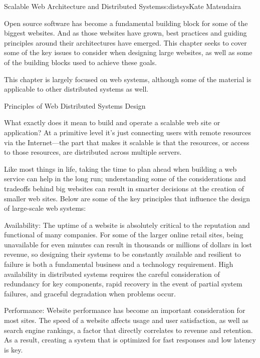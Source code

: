 \begin{aosachapter}{Scalable Web Architecture and Distributed Systems}{s:distsys}{Kate Matsudaira}

Open source software has become a fundamental building block for some
of the biggest websites. And as those websites have grown,
best practices and guiding principles around their architectures have
emerged. This chapter seeks to cover some of the key issues to
consider when designing large websites, as well as some of the
building blocks used to achieve these goals.

This chapter is largely focused on web systems, although some of the
material is applicable to other distributed systems as well.

\begin{aosasect1}{Principles of Web Distributed Systems Design}

What exactly does it mean to build and operate a scalable web site or
application? At a primitive level it's just connecting users with remote
resources via the Internet---the part that makes it scalable is
that the resources, or access to those resources, are distributed
across multiple servers.

Like most things in life, taking the time to plan ahead when building a
web service can help in
the long run; 
understanding some of the considerations and tradeoffs behind big
websites can result in smarter decisions at the creation of
smaller web sites. Below are some of the key principles that influence
the design of large-scale web systems:

\begin{aosadescription}

\item{Availability:} The uptime of a website is absolutely critical to
  the reputation and functional of many companies. For some of the
  larger online retail sites, being unavailable for even minutes can
  result in thousands or millions of dollars in lost revenue, so
  designing their systems to be constantly available and resilient to
  failure is both a fundamental business and a technology
  requirement. High availability in distributed systems requires the
  careful consideration of redundancy for key components, rapid
  recovery in the event of partial system failures, and graceful
  degradation when problems occur.

\item{Performance:} Website performance has become an important
  consideration for most sites. The speed of a website affects
  usage and user satisfaction, as well as search engine rankings, a
  factor that directly correlates to revenue and retention. As a
  result, creating a system that is optimized for fast responses and
  low latency is key.


\end{aosadescription}
\end{aosasect1}
\end{aosachapter}
